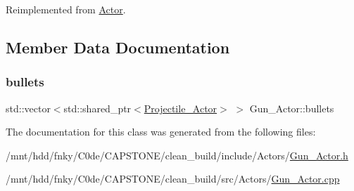Reimplemented from \hyperlink{classActor_a724ff8f2e9c34f15a6c443a3912504c4}{Actor}.



\subsection{Member Data Documentation}
\mbox{\label{classGun__Actor_a86eb484d33540f3e62678672adf921df}} 
\subsubsection{\texorpdfstring{bullets}{bullets}}
{\footnotesize\ttfamily std\+::vector$<$std\+::shared\+\_\+ptr$<$\hyperlink{classProjectile__Actor}{Projectile\+\_\+\+Actor}$>$ $>$ Gun\+\_\+\+Actor\+::bullets\hspace{0.3cm}{\ttfamily [private]}}



The documentation for this class was generated from the following files\+:\begin{DoxyCompactItemize}
\item 
/mnt/hdd/fnky/\+C0de/\+C\+A\+P\+S\+T\+O\+N\+E/clean\+\_\+build/include/\+Actors/\hyperlink{Gun__Actor_8h}{Gun\+\_\+\+Actor.\+h}\item 
/mnt/hdd/fnky/\+C0de/\+C\+A\+P\+S\+T\+O\+N\+E/clean\+\_\+build/src/\+Actors/\hyperlink{Gun__Actor_8cpp}{Gun\+\_\+\+Actor.\+cpp}\end{DoxyCompactItemize}
